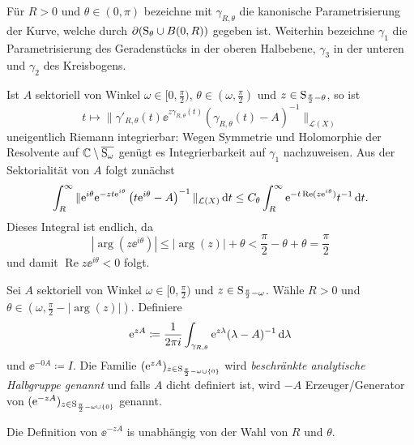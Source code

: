 \begin{ntion}
  Für $R > 0$ und $\theta \in (0,\pi)$ bezeichne mit $\gamma_{R, \theta}$ die kanonische Parametrisierung der Kurve, welche durch $\partial(\mathrm{S}_\theta \cup B(0,R))$ gegeben ist.
  Weiterhin bezeichne $\gamma_1$ die Parametrisierung des Geradenstücks in der oberen Halbebene, $\gamma_3$ in der unteren und $\gamma_2$ des Kreisbogens.
\end{ntion}

\begin{obs}
  \label{obs:integrablePath}
  Ist $A$ sektoriell von Winkel $\omega \in [0,\frac{\pi}{2} )$, $\theta \in (\omega, \frac{\pi}{2})$ und $z \in \mathrm{S}_{\frac{\pi}{2} - \theta}$, so ist 
  $$
  t \mapsto \|\gamma'_{R,\theta}(t) \ee^{z\gamma_{R,\theta}(t)} \left( \gamma_{R, \theta}(t) - A \right)^{-1} \|_{\mathcal{L}(X)}
  $$
  uneigentlich Riemann integrierbar: 
  Wegen Symmetrie und Holomorphie der Resolvente auf $\mathbb{C} \setminus \overline{\mathrm{S}_\omega}$ genügt es Integrierbarkeit auf $\gamma_1$ nachzuweisen.
  Aus der Sektorialität von $A$ folgt zunächst
  $$
    \int_{R}^\infty \| \mathrm{e}^{i\theta} \mathrm{e}^{-zt \mathrm{e}^{i\theta}} \left( t\mathrm{e}^{i\theta} - A \right)^{-1} \|_{\mathcal{L}(X)} \, {\operatorname{d}\!{t}}
    \leq C_\theta \int_R^\infty \mathrm{e}^{-t \operatorname{Re}(z \mathrm{e}^{i \theta})} t^{-1} \, {\operatorname{d}\!{t}}.
  $$
  Dieses Integral ist endlich, da
  $$
  |\arg(z \ee^{i \theta})| \leq |\arg(z)| + \theta < \frac{\pi}{2} - \theta + \theta = \frac{\pi}{2}
  $$
  und damit $\operatorname{Re}z \ee^{i\theta} < 0$ folgt.
\end{obs}

\begin{defn}
  Sei $A$ sektoriell von Winkel $\omega \in [0,\frac{\pi}{2})$ und $z \in \mathrm{S}_{\frac{\pi}{2} - \omega}$.
    Wähle $R > 0$ und $\theta \in (\omega, \frac{\pi}{2} - |\arg(z)|)$.
    Definiere
    $$
    \mathrm{e}^{zA} \coloneqq \frac{1}{2\pi i} \int_{\gamma_{R, \theta}} \mathrm{e}^{z\lambda } (\lambda - A)^{-1} \, {\operatorname{d}\!{\lambda}}
    $$
    und $\ee^{-0A} \coloneqq I$.
    Die Familie $(\mathrm{e}^{zA})_{z \in \mathrm{S}_{\frac{\pi}{2} - \omega \cup \{0\}}}$  wird \emph{beschränkte analytische Halbgruppe genannt} und falls $A$ dicht definiert ist, wird $-A$ Erzeuger/Generator von $(\mathrm{e}^{-zA})_{z \in \mathrm{S}_{\frac{\pi}{2} - \omega \cup \{0\}}}$ genannt.
\end{defn}

\begin{lem}
  \label{lem:welldefinedsg}
  Die Definition von $\ee^{-zA}$ is unabhängig von der Wahl von $R$ und $\theta$.
\end{lem}

